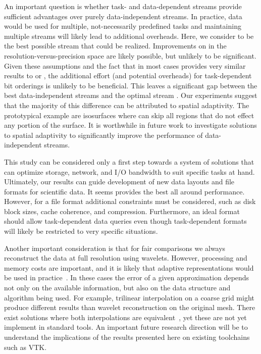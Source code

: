 {\color{red}An important question is whether task- and data-dependent streams provide sufficient
advantages over purely data-independent streams. In practice, data would be used for multiple,
not-necessarily predefined tasks and maintaining multiple streams will likely lead to additional
overheads. Here, we consider \ssig to be the best possible stream that could be realized.
Improvements on \ssig in the resolution-versus-precision space are likely possible, but unlikely to
be significant. Given these assumptions and the fact that \ssig in most cases provides very similar
results to \sbit or \swav, the additional effort (and potential overheads) for task-dependent bit
orderings is unlikely to be beneficial. This leaves a significant gap between the best
data-independent streams and the optimal stream \sopt. Our experiments suggest that the majority of
this difference can be attributed to spatial adaptivity. The prototypical example are isosurfaces
where \sopt can skip all regions that do not effect any portion of the surface. It is worthwhile in
future work to investigate solutions to spatial adaptivity to significantly improve the performance
of data-independent streams.}

This study can be considered only a first step towards a system of solutions that can optimize
storage, network, and I/O bandwidth to suit specific tasks at hand. Ultimately, our results can
guide development of new data layouts and file formats for scientific data. It seems \swav provides
the best all around performance. However, for a file format additional constraints must be
considered, such as disk block sizes, cache coherence, and compression. Furthermore, an ideal format
should allow task-dependent data queries even though task-dependent formats will likely be
restricted to very specific situations. 

Another important consideration is that for fair comparisons we always reconstruct the data at full
resolution using wavelets. However, processing and memory costs are important, and it is likely that
adaptive representations would be used in practice~\cite{gigavoxels,Gobbetti2008,vdb2013}. In these
cases the error of a given approximation depends not only on the available information, but also on
the data structure and algorithm being used. For example, trilinear interpolation on a coarse grid
might produce different results than wavelet reconstruction on the original mesh. There exist
solutions where both interpolations are equivalent~\cite{weiss}, yet these are not yet implement in
standard tools. An important future research direction will be to understand the implications of the
results presented here on existing toolchains such as VTK.

